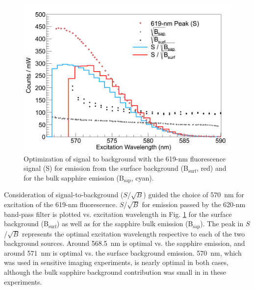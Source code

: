 \begin{figure} %
        \centering
                \includegraphics[width=.7\textwidth]{figures/S_to_B_both.png}
                \caption{Optimization of signal to background with the 619-nm fluorescence signal (S) for emission from the surface background (B$_{\text{surf}}$, red) and for the bulk sapphire emission (B$_{\text{sap}}$, cyan).}
        \label{fig:StoB}
\end{figure}

Consideration of signal-to-background ($S$/$\sqrt{B}$) guided the choice of 570~nm for excitation of the 619-nm fluorescence.  $S$/$\sqrt{B}$ for emission passed by the 620-nm band-pass filter is plotted vs. excitation wavelength in Fig. \ref{fig:StoB} for the surface background (B$_{\text{surf}}$) as well as for the sapphire bulk emission (B$_{\text{sap}}$).  The peak in $S$/$\sqrt{B}$ represents the optimal excitation wavelength respective to each of the two background sources.  Around 568.5~nm is optimal vs. the sapphire emission, and around 571~nm is optimal vs. the surface background emission. 570~nm, which was used in sensitive imaging experiments, is nearly optimal in both cases, although the bulk sapphire background contribution was small in in these experiments.




